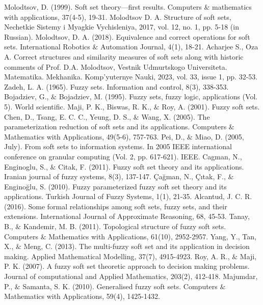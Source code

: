\documentclass{article}
\theoremstyle{definition}
\begin{document}
\begin{thebibliography}{}

   Molodtsov, D. (1999). Soft set theory—first results. Computers $\&$ mathematics with applications, 37(4-5), 19-31.
   Molodtsov D. A. Structure of soft sets, Nechetkie Sistemy i Myagkie Vychisleniya, 2017, vol. 12, no. 1, pp. 5-18 (in Russian).
   Molodtsov, D. A. (2018). Equivalence and correct operations for soft sets. International Robotics $\&$ Automation Journal, 4(1), 18-21.
   Acharjee S., Oza A. Correct structures and similarity measures of soft sets along with historic comments of Prof. D.A. Molodtsov, Vestnik Udmurtskogo Universiteta. Matematika. Mekhanika. Komp'yuternye Nauki, 2023, vol. 33, issue 1, pp. 32-53.
   Zadeh, L. A. (1965). Fuzzy sets. Information and control, 8(3), 338-353.
   Bojadziev, G., $\&$ Bojadziev, M. (1995). Fuzzy sets, fuzzy logic, applications (Vol. 5). World scientific.
   Maji, P. K., Biswas, R. K., $\&$ Roy, A. (2001). Fuzzy soft sets.
   Chen, D., Tsang, E. C. C., Yeung, D. S., $\&$ Wang, X. (2005). The parameterization reduction of soft sets and its applications. Computers $\&$ Mathematics with Applications, 49(5-6), 757-763.
   Pei, D., $\&$ Miao, D. (2005, July). From soft sets to information systems. In 2005 IEEE international conference on granular computing (Vol. 2, pp. 617-621). IEEE.
   Cagman, N., Enginoglu, S., $\&$ Citak, F. (2011). Fuzzy soft set theory and its applications. Iranian journal of fuzzy systems, 8(3), 137-147.
   Çağman, N., Çıtak, F., $\&$ Enginoğlu, S. (2010). Fuzzy parameterized fuzzy soft set theory and its applications. Turkish Journal of Fuzzy Systems, 1(1), 21-35.
   Alcantud, J. C. R. (2016). Some formal relationships among soft sets, fuzzy sets, and their extensions. International Journal of Approximate Reasoning, 68, 45-53.
   Tanay, B., $\&$ Kandemir, M. B. (2011). Topological structure of fuzzy soft sets. Computers $\&$ Mathematics with Applications, 61(10), 2952-2957. 
   Yang, Y., Tan, X., $\&$ Meng, C. (2013). The multi-fuzzy soft set and its application in decision making. Applied Mathematical Modelling, 37(7), 4915-4923.
   Roy, A. R., $\&$ Maji, P. K. (2007). A fuzzy soft set theoretic approach to decision making problems. Journal of computational and Applied Mathematics, 203(2), 412-418.
   Majumdar, P., $\&$ Samanta, S. K. (2010). Generalised fuzzy soft sets. Computers $\&$ Mathematics with Applications, 59(4), 1425-1432.

\end{thebibliography}
\end{document}
